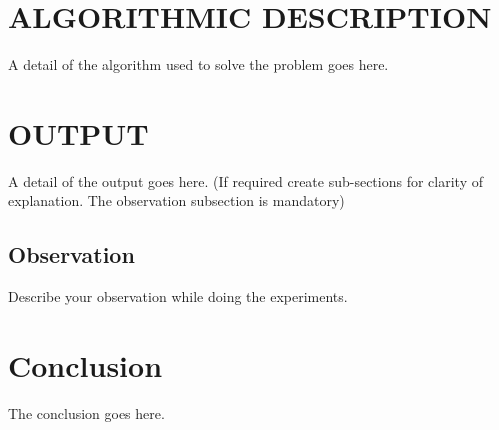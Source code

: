 \documentclass[journal]{IEEEtran}
\begin{document}
%


\section{ALGORITHMIC DESCRIPTION}
A detail of the algorithm used to solve the problem goes here.
\section{OUTPUT}
A detail of the output goes here. (If required create sub-sections for clarity of explanation. The observation subsection is mandatory)
\subsection{Observation}
Describe your observation while doing the experiments.
\section{Conclusion}
The conclusion goes here.
\end{document}
